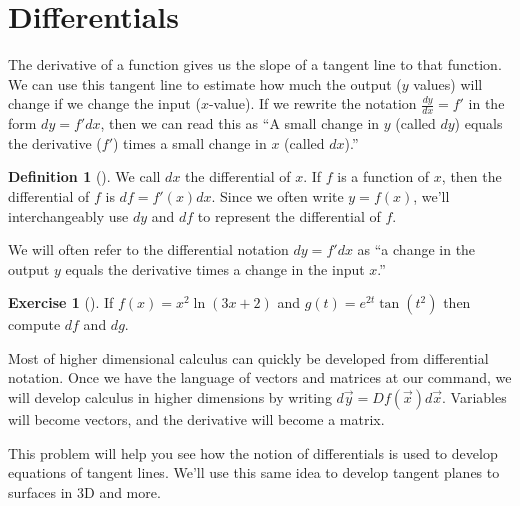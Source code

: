 \documentclass[10pt,]{book}
\theoremstyle{plain}
\theoremstyle{definition}
\newtheorem{definition}[theorem]{Definition}
\theoremstyle{definition}
\theoremstyle{definition}
\theoremstyle{definition}
\newtheorem{exploration}[project]{Exercise}
\theoremstyle{definition}
\numberwithin{equation}{section}
\newcommand{\ds}{\displaystyle}
\begin{document}
\section[{Differentials}]{Differentials}\label{ch01_2_differentials}
The derivative of a function gives us the slope of a tangent line to that function. We can use this tangent line to estimate how much the output (\(y\) values) will change if we change the input (\(x\)-value). If we rewrite the notation \(\ds\frac{dy}{dx}=f'\) in the form \(dy=f' dx\), then we can read this as ``A small change in \(y\) (called \(dy\)) equals the derivative (\(f'\)) times a small change in \(x\) (called \(dx\)).''%
\begin{definition}[{}]\label{definition-1}
We call \(dx\) the differential of \(x\). If \(f\) is a function of \(x\), then the differential of \(f\) is \(df = f'(x) dx\). Since we often write \(y=f(x)\), we'll interchangeably use \(dy\) and \(df\) to represent the differential of \(f\).%
\end{definition}
We will often refer to the differential notation \(dy=f'dx\) as ``a change in the output \(y\) equals the derivative times a change in the input \(x\).''%
\begin{exploration}[]\label{exploration-9}
If \(f(x) = x^2\ln(3x+2)\) and \(g(t) = e^{2t}\tan(t^2)\) then compute \(df\) and \(dg\).%
\end{exploration}
Most of higher dimensional calculus can quickly be developed from differential notation. Once we have the language of vectors and matrices at our command, we will develop calculus in higher dimensions by writing \(d\vec y = Df(\vec x) d\vec x\). Variables will become vectors, and the derivative will become a matrix.%
\par
This problem will help you see how the notion of differentials is used to develop equations of tangent lines. We'll use this same idea to develop tangent planes to surfaces in 3D and more.%
\end{document}

